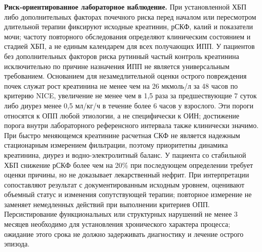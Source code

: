 \documentclass[11pt,a4paper,notitlepage]{report}
\newcommand{\src}[1]{\unskip\space\cite{#1}}
\begin{document}
\textbf{Риск-ориентированное лабораторное наблюдение.} При установленной ХБП либо дополнительных факторах почечного риска перед началом или пересмотром длительной терапии фиксируют исходные креатинин, рСКФ, калий и показатели мочи; частоту повторного обследования определяют клиническим состоянием и стадией ХБП, а не единым календарем для всех получающих ИПП. У пациентов без дополнительных факторов риска рутинный частый контроль креатинина исключительно по причине назначения ИПП не является универсальным требованием.\src{renalkdigo2024,acggerd} Основанием для незамедлительной оценки острого повреждения почек служат рост креатинина не менее чем на 26 мкмоль/л за 48 часов по критерию NICE, увеличение не менее чем в 1,5 раза за предшествующие 7 суток либо диурез менее 0,5 мл/кг/ч в течение более 6 часов у взрослого. Эти пороги относятся к ОПП любой этиологии, а не специфически к ОИН; достижение порога внутри лабораторного референсного интервала также клинически значимо.\src{renalniceaki} При быстро меняющемся креатинине расчетная СКФ не является надежным стационарным измерением фильтрации, поэтому приоритетны динамика креатинина, диурез и водно-электролитный баланс. У пациента со стабильной ХБП снижение рСКФ более чем на 20\% при последующем определении требует оценки причины, но не доказывает лекарственный нефрит. При интерпретации сопоставляют результат с документированным исходным уровнем, оценивают объемный статус и изменения сопутствующей терапии; повторное измерение не заменяет немедленных действий при выполнении критериев ОПП. Персистирование функциональных или структурных нарушений не менее 3 месяцев необходимо для установления хронического характера процесса; ожидание этого срока не должно задерживать диагностику и лечение острого эпизода.\src{renalniceckd,renalkdigo2024}
\end{document}
